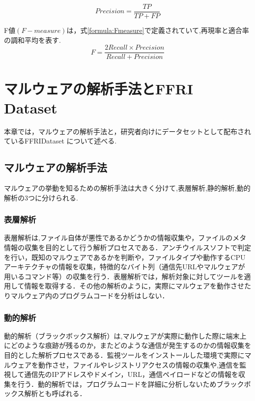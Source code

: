 \documentclass{thesis}
\begin{document}
\begin{equation}
	\label{formula:precision}
	Precision = \frac{TP}{TP + FP}
\end{equation}

F値$(F-measure)$は，式\ref{formula:Fmeasure}で定義されていて,再現率と適合率の調和平均を表す.
\begin{equation}
	\label{formula:Fmeasure}
	F = \frac{2Recall \times Precision}{Recall+Precision}
\end{equation}


\chapter{マルウェアの解析手法とFFRI Dataset}
本章では，マルウェアの解析手法と，研究者向けにデータセットとして配布されているFFRIDataset について述べる.

\section{マルウェアの解析手法}
マルウェアの挙動を知るための解析手法は大きく分けて,表層解析,静的解析,動的解析の3つに分けられる\cite{解析}.

\subsection*{表層解析}
表層解析は,ファイル自体が悪性であるかどうかの情報収集や，ファイルのメタ情報の収集を目的として行う解析プロセスである．アンチウイルスソフトで判定を行い，既知のマルウェアであるかを判断や，ファイルタイプや動作するCPUアーキテクチャの情報を収集，特徴的なバイト列（通信先URLやマルウェアが用いるコマンド等）の収集を行う．表層解析では，解析対象に対してツールを適用して情報を取得する．その他の解析のように，実際にマルウェアを動作させたりマルウェア内のプログラムコードを分析はしない．

\subsection*{動的解析}
動的解析（ブラックボックス解析）は,マルウェアが実際に動作した際に端末上にどのような痕跡が残るのか，またどのような通信が発生するのかの情報収集を目的とした解析プロセスである．監視ツールをインストールした環境で実際にマルウェアを動作させ，ファイルやレジストリアクセスの情報の収集や,通信を監視して通信先のIPアドレスやドメイン，URL，通信ペイロードなどの情報を収集を行う．動的解析では，プログラムコードを詳細に分析しないためブラックボックス解析とも呼ばれる．
\end{document}

